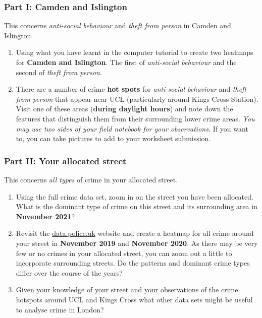 \documentclass[
]{book}
\providecommand{\tightlist}{%
  \setlength{\itemsep}{0pt}\setlength{\parskip}{0pt}}
\begin{document}
\hypertarget{part-i-camden-and-islington}{%
\subsubsection*{Part I: Camden and Islington}\label{part-i-camden-and-islington}}

This concerns \emph{anti-social behaviour} and \emph{theft from person} in Camden and Islington.

\begin{enumerate}
\def\labelenumi{\arabic{enumi}.}
\tightlist
\item
  Using what you have learnt in the computer tutorial to create two heatmaps for \textbf{Camden and Islington}. The first of \emph{anti-social behaviour} and the second of \emph{theft from person}.
\item
  There are a number of crime \textbf{hot spots} for \emph{anti-social behaviour} and \emph{theft from person} that appear near UCL (particularly around Kings Cross Station). Visit one of these areas (\textbf{during daylight hours}) and note down the features that distinguish them from their surrounding lower crime areas. \emph{You may use two sides of your field notebook for your observations.} If you want to, you can take pictures to add to your worksheet submission.
\end{enumerate}

\hypertarget{part-ii-your-allocated-street}{%
\subsubsection*{Part II: Your allocated street}\label{part-ii-your-allocated-street}}

This concerns \emph{all types} of crime in your allocated street.

\begin{enumerate}
\def\labelenumi{\arabic{enumi}.}
\setcounter{enumi}{2}
\tightlist
\item
  Using the full crime data set, zoom in on the street you have been allocated. What is the dominant type of crime on this street and its surrounding area in \textbf{November 2021}?
\item
  Revisit the \href{https://data.police.uk/}{data.police.uk} website and create a heatmap for all crime around your street in \textbf{November 2019} and \textbf{November 2020}. As there may be very few or no crimes in your allocated street, you can zoom out a little to incorporate surrounding streets. Do the patterns and dominant crime types differ over the course of the years?
\item
  Given your knowledge of your street and your observations of the crime hotspots around UCL and Kings Cross what other data sets might be useful to analyse crime in London?
\end{enumerate}
\end{document}
